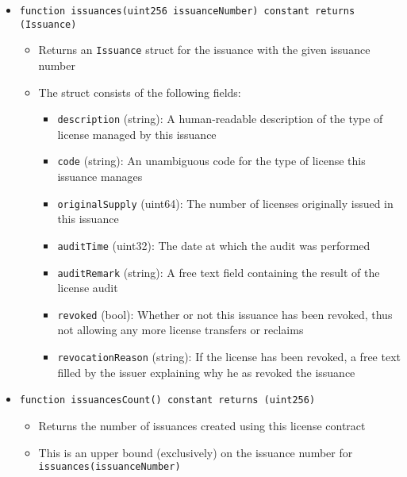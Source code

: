 \documentclass[a4paper]{article}
\begin{document}
\begin{itemize}
  \item \texttt{function issuances(uint256 issuanceNumber) constant returns (Issuance)}
  \begin{itemize}
    \item Returns an \texttt{Issuance} struct for the issuance with the given issuance number
    \item The struct consists of the following fields:
    \begin{itemize}
      \item \texttt{description} (string): A human-readable description of the type of license managed by this issuance
      \item \texttt{code} (string): An unambiguous code for the type of license this issuance manages
      \item \texttt{originalSupply} (uint64): The number of licenses originally issued in this issuance
      \item \texttt{auditTime} (uint32): The date at which the audit was performed
      \item \texttt{auditRemark} (string): A free text field containing the result of the license audit
      \item \texttt{revoked} (bool): Whether or not this issuance has been revoked, thus not allowing any more license transfers or reclaims
      \item \texttt{revocationReason} (string): If the license has been revoked, a free text filled by the issuer explaining why he as revoked the issuance
    \end{itemize}
  \end{itemize}
  
  \item \texttt{function issuancesCount() constant returns (uint256)}
  \begin{itemize}
    \item Returns the number of issuances created using this license contract
    \item This is an upper bound (exclusively) on the issuance number for \texttt{issuances(issuanceNumber)}
  \end{itemize}
  

\end{itemize}
\end{document}
